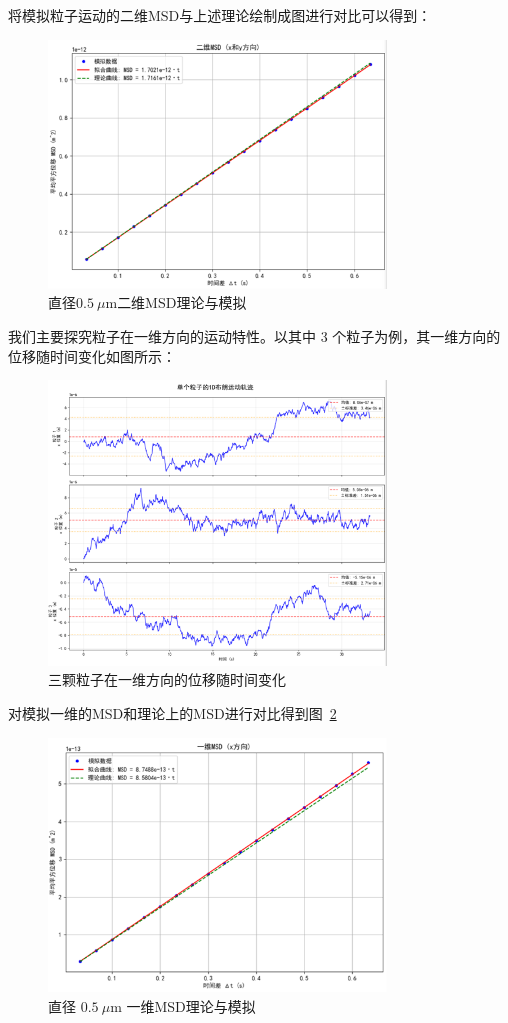\documentclass[a4paper]{report} %
\begin{document}
将模拟粒子运动的二维MSD与上述理论绘制成图进行对比可以得到：
\begin{figure}[H]
  \centering
  \includegraphics[width=0.8\textwidth]{二维MSD.png}
  \caption{直径$0.5~\mu\text{m}$二维MSD理论与模拟}
\end{figure}
我们主要探究粒子在一维方向的运动特性。以其中 3 个粒子为例，其一维方向的位移随时间变化如图所示：
\begin{figure}[H]
  \centering
  \includegraphics[width=0.8\textwidth]{displacement.png}
  \caption{三颗粒子在一维方向的位移随时间变化}
  \label{fig:displacement}
\end{figure}
对模拟一维的MSD和理论上的MSD进行对比得到图~\ref{fig:yiwei}
\begin{figure}[H]
  \centering
  \includegraphics[width=0.8\textwidth]{一维MSD.png}
  \caption{直径 $0.5~\mu$m 一维MSD理论与模拟}
  \label{fig:yiwei}
\end{figure}
\end{document}

